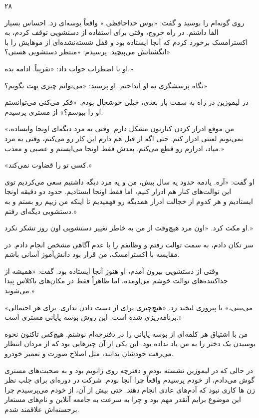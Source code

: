۲۸

روی گونه‌ام را بوسید و گفت: «بوس خداحافظی.» واقعاً بوسه‌ای زد. احساس بسیار الفا داشتم. در راه خروج، وقتی برای استفاده از دستشویی توقف کردم، به اکسترامسک برخورد کردم که آنجا ایستاده بود و قفل شسته‌نشده‌ای از موهایش را با انگشتانش می‌پیچید. پرسیدم: «منتظر دستشویی هستی؟»

او با اضطراب جواب داد: «تقریباً. ادامه بده.»

نگاه پرسشگری به او انداختم. او پرسید: «می‌توانم چیزی بهت بگویم؟»

در لیموزین در راه به سمت بار بعدی، خیلی خوشحال بودم. «فکر می‌کنی می‌توانستم او را ببوسم؟» از مستری پرسیدم.

«من موقع ادرار کردن کنارتون مشکل دارم. وقتی یه مرد دیگه‌ای اونجا وایساده، نمی‌تونم لعنتی ادرار کنم. حتی اگه از قبل هم دارم این کار رو می‌کنم، وقتی یه مرد میاد، ادرارم رو قطع می‌کنم. بعدش فقط اونجا می‌ایستم و عصبی و معذب.»

«کسی تو را قضاوت نمی‌کند.»

او گفت: «آره. یادمه حدود یه سال پیش، من و یه مرد دیگه داشتیم سعی می‌کردیم توی این توالت‌های کنار هم ادرار کنیم، اما فقط اونجا ایستادیم. حدود دو دقیقه اونجا ایستادیم و هر کدوم از خجالت ادرار همدیگه رو فهمیدیم تا اینکه من زیپم رو بستم و به دستشویی دیگه‌ای رفتم.»

او مکث کرد. «اون مرد هیچ‌وقت از من به خاطر تغییر دستشویی اون روز تشکر نکرد.»

سر تکان دادم، به سمت توالت رفتم و وظایفم را با عدم آگاهی مشخص انجام دادم. در مقایسه با اکسترامسک، من قرار بود دانش‌آموز آسانی باشم.

وقتی از دستشویی بیرون آمدم، او هنوز آنجا ایستاده بود. گفت: «همیشه از جداکننده‌های توالت خوشم می‌اومده، اما ظاهراً فقط در مکان‌های باکلاس پیدا می‌شوند.»

«می‌بینی،» با پیروزی لبخند زد. «هیچ‌چیزی برای از دست دادن نداری. برای هر احتمالی برنامه‌ریزی شده است. این روش بوسه پایانی مستری است.»

من با اشتیاق هر کلمه‌ای از بوسه پایانی را در دفترچه‌ام نوشتم. هیچ‌کس تاکنون نحوه بوسیدن یک دختر را به من یاد نداده بود. این یکی از آن چیزهایی بود که از مردان انتظار می‌رفت خودشان بدانند، مثل اصلاح صورت و تعمیر خودرو.

در حالی که در لیموزین نشسته بودم و دفترچه روی زانویم بود و به صحبت‌های مستری گوش می‌دادم، از خودم پرسیدم واقعاً چرا آنجا بودم. شرکت در دوره‌ای برای جلب نظر زن ها کاری نبود که آدم‌های عادی انجام دهند. حتی بیش از آن، از خودم می‌پرسیدم چرا این موضوع برایم آنقدر مهم بود و چرا به سرعت به جامعه آنلاین و نام‌های مستعار برجسته‌اش علاقمند شدم.